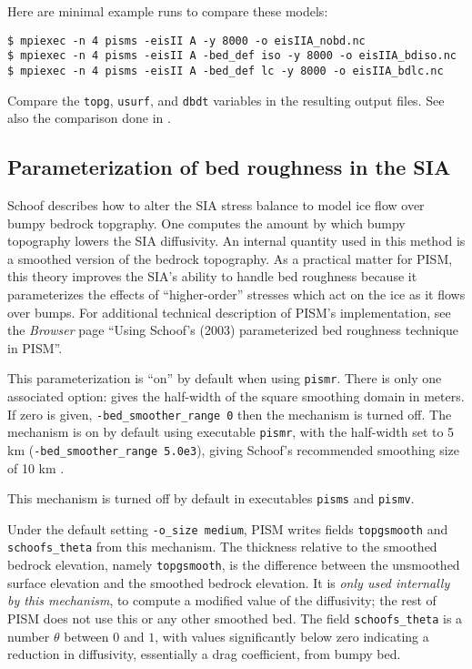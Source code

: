 Here are minimal example runs to compare these models:
\begin{verbatim}
$ mpiexec -n 4 pisms -eisII A -y 8000 -o eisIIA_nobd.nc
$ mpiexec -n 4 pisms -eisII A -bed_def iso -y 8000 -o eisIIA_bdiso.nc
$ mpiexec -n 4 pisms -eisII A -bed_def lc -y 8000 -o eisIIA_bdlc.nc
\end{verbatim}
Compare the \texttt{topg}, \texttt{usurf}, and \texttt{dbdt} variables in the resulting output files.  See also the comparison done in \cite{BLKfastearth}.


\subsection{Parameterization of bed roughness in the SIA} \label{subsect:bedsmooth} 

Schoof \cite{Schoofbasaltopg2003} describes how to alter the SIA stress balance to model ice flow over bumpy bedrock topgraphy.  One computes the amount by which bumpy topography lowers the SIA diffusivity.  An internal quantity used in this method is a smoothed version of the bedrock topography.  As a practical matter for PISM, this theory improves the SIA's ability to handle bed roughness because it parameterizes the effects of ``higher-order'' stresses which act on the ice as it flows over bumps.  For additional technical description of PISM's implementation, see the \emph{Browser} page ``Using Schoof's (2003) parameterized bed roughness technique in PISM''.

This parameterization is ``on'' by default when using \texttt{pismr}.  There is only one associated option:  gives the half-width of the square smoothing domain in meters.  If zero is given, \texttt{-bed_smoother_range 0} then the mechanism is turned off.  The mechanism is on by default using executable \texttt{pismr}, with the half-width set to 5 km (\texttt{-bed_smoother_range 5.0e3}), giving Schoof's recommended smoothing size of 10 km \cite{Schoofbasaltopg2003}.

This mechanism is turned off by default in executables \texttt{pisms} and \texttt{pismv}.

Under the default setting \texttt{-o_size medium}, PISM writes fields \texttt{topgsmooth} and \texttt{schoofs_theta} from this mechanism.  The thickness relative to the smoothed bedrock elevation, namely \texttt{topgsmooth}, is the difference between the unsmoothed surface elevation and the smoothed bedrock elevation.  It is \emph{only used internally by this mechanism}, to compute a modified value of the diffusivity; the rest of PISM does not use this or any other smoothed bed.  The field \texttt{schoofs_theta} is a number $\theta$ between $0$ and $1$, with values significantly below zero indicating a reduction in diffusivity, essentially a drag coefficient, from bumpy bed.



